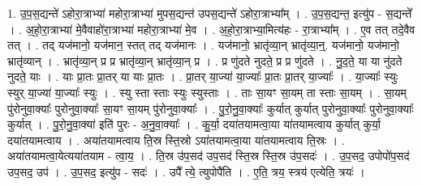 \documentclass[17pt]{extarticle}
\begin{document}
1. उ॒प॒स॒द्यन्ते॑ ऽहोरा॒त्राभ्या॑ महोरा॒त्राभ्या॑ मुपस॒द्यन्त॑ उपस॒द्यन्ते॑ ऽहोरा॒त्राभ्या᳚म् । . उ॒प॒स॒द्यन्त॒ इत्यु॑प - स॒द्यन्ते᳚ । . अ॒हो॒रा॒त्राभ्या॑ मे॒वैवाहो॑रा॒त्राभ्या॑ महोरा॒त्राभ्या॑ मे॒व । . अ॒हो॒रा॒त्राभ्या॒मित्य॑हः - रा॒त्राभ्या᳚म् । . ए॒व तत् तदे॒वैव तत् । . तद् यज॑मानो॒ यज॑मान॒ स्तत् तद् यज॑मानः । . यज॑मानो॒ भ्रातृ॑व्या॒न् भ्रातृ॑व्या॒न्॒. यज॑मानो॒ यज॑मानो॒ भ्रातृ॑व्यान् । . भ्रातृ॑व्या॒न् प्र प्र भ्रातृ॑व्या॒न् भ्रातृ॑व्या॒न् प्र । . प्र णु॑दते नुदते॒ प्र प्र णु॑दते । . नु॒द॒ते॒ या या नु॑दते नुदते॒ याः । . याः प्रा॒तः प्रा॒तर् या याः प्रा॒तः । . प्रा॒तर् या॒ज्या॑ या॒ज्याः᳚ प्रा॒तः प्रा॒तर् या॒ज्याः᳚ । . या॒ज्याः᳚ स्युः स्युर् या॒ज्या॑ या॒ज्याः᳚ स्युः । . स्यु स्ता स्ताः स्युः स्युस्ताः । . ताः सा॒यꣳ सा॒यम् ता स्ताः सा॒यम् । . सा॒यम् पु॑रोनुवा॒क्याः᳚ पुरोनुवा॒क्याः᳚ सा॒यꣳ सा॒यम् पु॑रोनुवा॒क्याः᳚ । . पु॒रो॒नु॒वा॒क्याः᳚ कुर्यात् कुर्यात् पुरोनुवा॒क्याः᳚ पुरोनुवा॒क्याः᳚ कुर्यात् । . पु॒रो॒नु॒वा॒क्या॑ इति॑ पुरः - अ॒नु॒वा॒क्याः᳚ । . कु॒र्या॒ दया॑तयामत्वा॒या या॑तयामत्वाय कुर्यात् कुर्या॒ दया॑तयामत्वाय । . अया॑तयामत्वाय ति॒स्र स्ति॒स्रो ऽया॑तयामत्वा॒या या॑तयामत्वाय ति॒स्रः । . अया॑तयामत्वा॒येत्यया॑तयाम - त्वा॒य॒ । . ति॒स्र उ॑प॒सद॑ उप॒सद॑ स्ति॒स्र स्ति॒स्र उ॑प॒सदः॑ । . उ॒प॒सद॒ उपोपो॑प॒सद॑ उप॒सद॒ उप॑ । . उ॒प॒सद॒ इत्यु॑प - सदः॑ । . उपै᳚ त्ये॒ त्युपोपै॑ति । . ए॒ति॒ त्रय॒ स्त्रय॑ एत्येति॒ त्रयः॑ । \newline
\end{document}
